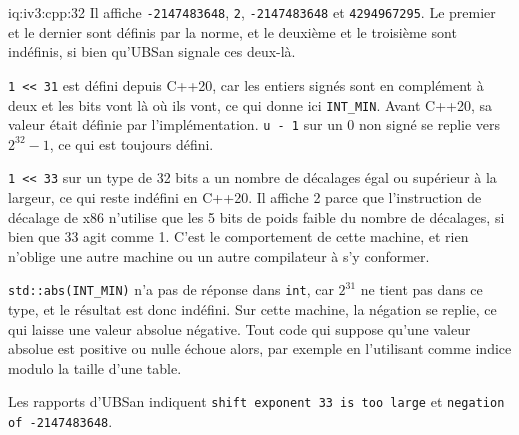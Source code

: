 \begin{solution}{iq:iv3:cpp:32}
Il affiche \texttt{-2147483648}, \texttt{2}, \texttt{-2147483648} et \texttt{4294967295}. Le premier et le dernier sont définis par la norme, et le deuxième et le troisième sont indéfinis, si bien qu'UBSan signale ces deux-là.

\texttt{1 <{}< 31} est défini depuis C++20, car les entiers signés sont en complément à deux et les bits vont là où ils vont, ce qui donne ici \texttt{INT\_MIN}. Avant C++20, sa valeur était définie par l'implémentation. \texttt{u - 1} sur un 0 non signé se replie vers $2^{32} - 1$, ce qui est toujours défini.

\texttt{1 <{}< 33} sur un type de 32 bits a un nombre de décalages égal ou supérieur à la largeur, ce qui reste indéfini en C++20. Il affiche 2 parce que l'instruction de décalage de x86 n'utilise que les 5 bits de poids faible du nombre de décalages, si bien que 33 agit comme 1. C'est le comportement de cette machine, et rien n'oblige une autre machine ou un autre compilateur à s'y conformer.

\texttt{std::abs(INT\_MIN)} n'a pas de réponse dans \texttt{int}, car $2^{31}$ ne tient pas dans ce type, et le résultat est donc indéfini. Sur cette machine, la négation se replie, ce qui laisse une valeur absolue négative. Tout code qui suppose qu'une valeur absolue est positive ou nulle échoue alors, par exemple en l'utilisant comme indice modulo la taille d'une table.

Les rapports d'UBSan indiquent \texttt{shift exponent 33 is too large} et \texttt{negation of -2147483648}.

\end{solution}

